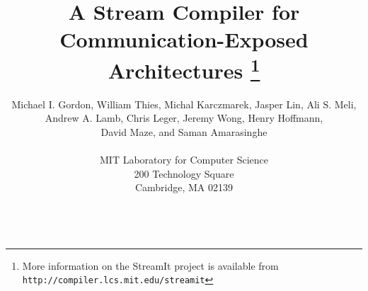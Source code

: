 \documentclass{sig-alternate}
\begin{document}

\title{A Stream Compiler for \\ Communication-Exposed Architectures
\huge\thanks{More information on the StreamIt project is available
from \texttt{\tt http://compiler.lcs.mit.edu/streamit}}}


\author{Michael I. Gordon, William Thies, Michal Karczmarek, Jasper Lin, Ali S. Meli,\\ Andrew A. Lamb, Chris Leger, Jeremy Wong, Henry Hoffmann,\\ David Maze, and Saman Amarasinghe \\ ~ \\
  MIT Laboratory for Computer Science \\
  200 Technology Square \\
  Cambridge, MA  02139 \\ ~ \\
  }




\date{}
\end{document}
